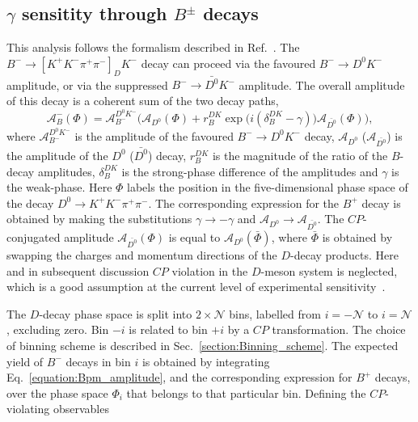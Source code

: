 \documentclass[12pt, a4paper, notitlepage, onecolumn]{article}
\begin{document}
\subsection{\texorpdfstring{$\gamma$}{gamma} sensitity through \texorpdfstring{$B^\pm$}{B} decays}
This analysis follows the formalism described in Ref.~\cite{LHCb-PAPER-2020-019}. The $B^-\to[K^+K^-\pi^+\pi^-]_D K^-$ decay can proceed via the favoured $B^-\to D^0K^-$ amplitude, or via the suppressed $B^-\to\bar{D^0}K^-$ amplitude. The overall amplitude of this decay is a coherent sum of the two decay paths,
\begin{equation}
    \mathcal{A}_B^-(\Phi) = \mathcal{A}_{B^-}^{D^0K^-}\Big(\mathcal{A}_{D^0}(\Phi) + r_B^{DK}\exp\big(i(\delta_B^{DK} - \gamma)\big)\mathcal{A}_{\bar{D^0}}(\Phi)\Big),
    \label{equation:Bpm_amplitude}
\end{equation}
where $\mathcal{A}_{B^-}^{D^0K^-}$ is the amplitude of the favoured $B^-\to D^0 K^-$ decay, $\mathcal{A}_{D^0}$ ($\mathcal{A}_{\bar{D^0}}$) is the amplitude of the $D^0$ ($\bar{D^0}$) decay, $r_B^{DK}$ is the magnitude of the ratio of the $B$-decay amplitudes, $\delta_B^{DK}$ is the strong-phase difference of the amplitudes and $\gamma$ is the weak-phase. Here $\Phi$ labels the position in the five-dimensional phase space of the decay $D^0\to K^+K^-\pi^+\pi^-$. The corresponding expression for the $B^+$ decay is obtained by making the substitutions $\gamma\to -\gamma$ and $\mathcal{A}_{D^0}\to\mathcal{A}_{\bar{D^0}}$. The $C\!P$-conjugated amplitude $\mathcal{A}_{\bar{D^0}}(\Phi)$ is equal to $\mathcal{A}_{D^0}(\bar{\Phi})$, where $\bar{\Phi}$ is obtained by swapping the charges and momentum directions of the $D$-decay products. Here and in subsequent discussion $C\!P$ violation in the $D$-meson system is neglected, which is a good assumption at the current level of experimental sensitivity~\cite{HFLAV18}.

The $D$-decay phase space is split into $2\times\mathcal{N}$ bins, labelled from $i = -\mathcal{N}$ to $i = \mathcal{N}$, excluding zero. Bin $-i$ is related to bin $+i$ by a $C\!P$ transformation. The choice of binning scheme is described in Sec.~\ref{section:Binning_scheme}. The expected yield of $B^-$ decays in bin $i$ is obtained by integrating Eq.~\eqref{equation:Bpm_amplitude}, and the corresponding expression for $B^+$ decays, over the phase space $\Phi_i$ that belongs to that particular bin. Defining the $C\!P$-violating observables
\end{document}
